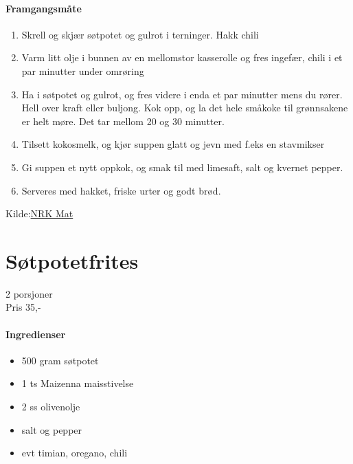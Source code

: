 \documentclass[12pt,a4paper]{book}
\begin{document}
\paragraph{Framgangsmåte}
\begin{enumerate}[noitemsep]
	\item Skrell og skjær søtpotet og gulrot i terninger. Hakk chili
	\item Varm litt olje i bunnen av en mellomstor kasserolle  og fres ingefær, chili i et par minutter under omrøring
	\item Ha i søtpotet og gulrot, og fres videre i enda et par minutter mens du rører. Hell over kraft eller buljong. Kok opp, og la det hele småkoke til grønnsakene er helt møre. Det tar mellom 20 og 30 minutter.
	\item Tilsett kokosmelk, og kjør suppen glatt og jevn med f.eks en stavmikser
	\item Gi suppen et nytt oppkok, og smak til med limesaft, salt og kvernet pepper.
	\item Serveres med hakket, friske urter og godt brød.
\end{enumerate}

Kilde:\href{https://www.nrk.no/mat/sotpotet--og-gulrotsuppe-med-kokosmelk-1.13146935}{NRK Mat}
\clearpage{}
\clearpage{}\section{﻿Søtpotetfrites}
\label{frites}

2 porsjoner\\
Pris 35,-

\paragraph{Ingredienser}
\begin{itemize}[noitemsep]
	\item 500 gram søtpotet
	\item 1 ts Maizenna maisstivelse
	\item 2 ss olivenolje
	\item salt og pepper
	\item evt timian, oregano, chili
\end{itemize}
\end{document}
